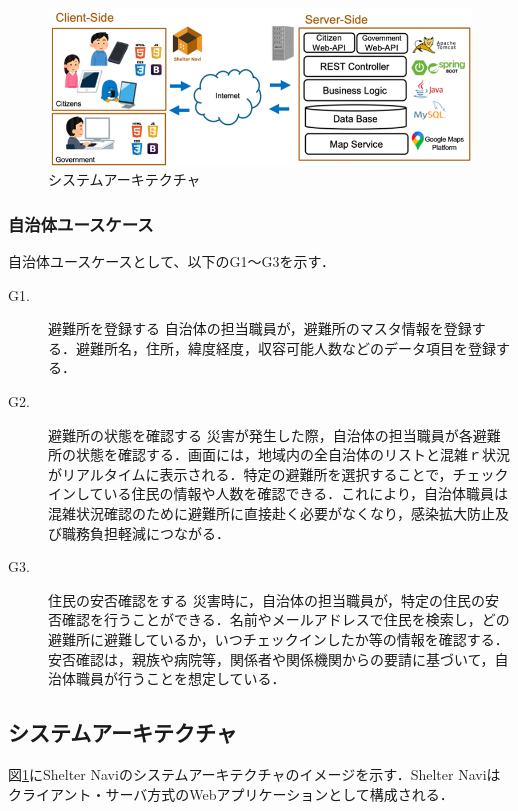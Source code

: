 \documentclass[technicalreport,dvipdfmx]{ieicej}
\begin{document}
\begin{figure}[!t]
     \begin{center}
          \includegraphics[width=0.8\linewidth,pagebox=cropbox,clip]{img/architecture.png}
          \caption{システムアーキテクチャ}
          \label{fig:architecture}
     \end{center}
\end{figure}


\subsubsection{自治体ユースケース}
自治体ユースケースとして、以下のG1～G3を示す．

\begin{description}
     \item[G1.] 避難所を登録する
     自治体の担当職員が，避難所のマスタ情報を登録する．避難所名，住所，緯度経度，収容可能人数などのデータ項目を登録する．

     \item[G2.] 避難所の状態を確認する
     災害が発生した際，自治体の担当職員が各避難所の状態を確認する．画面には，地域内の全自治体のリストと混雑ｒ状況がリアルタイムに表示される．特定の避難所を選択することで，チェックインしている住民の情報や人数を確認できる．これにより，自治体職員は混雑状況確認のために避難所に直接赴く必要がなくなり，感染拡大防止及び職務負担軽減につながる．

     \item[G3.] 住民の安否確認をする
     災害時に，自治体の担当職員が，特定の住民の安否確認を行うことができる．名前やメールアドレスで住民を検索し，どの避難所に避難しているか，いつチェックインしたか等の情報を確認する．安否確認は，親族や病院等，関係者や関係機関からの要請に基づいて，自治体職員が行うことを想定している．
\end{description}

\subsection{システムアーキテクチャ}

図\ref{fig:architecture}にShelter Naviのシステムアーキテクチャのイメージを示す．Shelter Naviはクライアント・サーバ方式のWebアプリケーションとして構成される．
\end{document}
